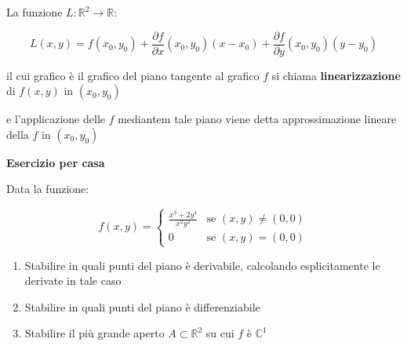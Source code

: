 \documentclass[11pt]{article}
\begin{document}
La funzione $L: \mathbb{R}^{2} \rightarrow \mathbb{R}$:

\[
    L(x,y) = f(x_0,y_0) + \frac{\partial f}{\partial x}(x_0,y_0) (x-x_0) + \frac{\partial f}{\partial y}(x_0,y_0) (y-y_0)
\]

il cui grafico è il grafico del piano tangente al grafico $f$ si chiama \textbf{linearizzazione} di $f(x,y)$ in $(x_0,y_0)$


e l'applicazione delle $f$ mediantem tale piano viene detta approssimazione lineare della $f$ in $(x_0,y_0)$

\textbf{Esercizio per casa} 

Data la funzione:

\[
    f(x,y) = \begin{cases}
        \frac{x^{3}+2y^{4}}{x^{2}y^{2}} & \text{se $(x,y) \neq (0,0)$} \\
        0 & \text{se $(x,y) = (0,0)$}
    \end{cases}
\]

\begin{enumerate}
    \item Stabilire in quali punti del piano è derivabile, calcolando esplicitamente le derivate in tale caso
    \item Stabilire in quali punti del piano è differenziabile
    \item Stabilire il più grande aperto $A \subset \mathbb{R}^{2}$ su cui $f$ è $\mathbb{C}^{1}$
\end{enumerate}
\end{document}
